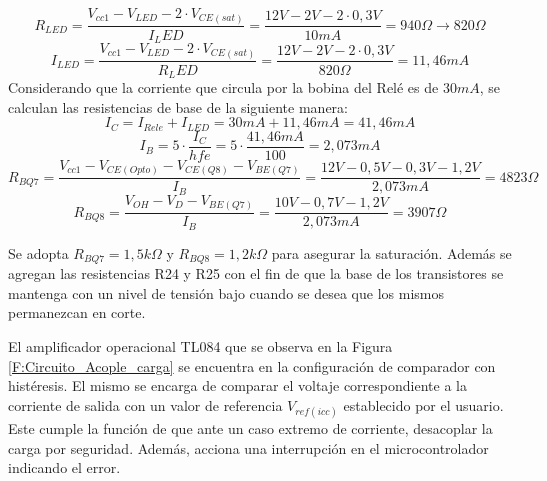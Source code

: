 \begin{equation}
R_{LED}=\frac{V_{cc1}-V_{LED}-2\cdot V_{CE(sat)}}{I_LED}=\frac{12V-2V-2\cdot 0,3V}{10 mA}=940\Omega \to 820 \Omega
\end{equation}
\begin{equation}
I_{LED}=\frac{V_{cc1}-V_{LED}-2\cdot V_{CE(sat)}}{R_LED}=\frac{12V-2V-2\cdot 0,3V}{820 \Omega}=11,46 mA
\end{equation}
Considerando que la corriente que circula por la bobina del Relé es de $30 mA$, se calculan las resistencias de base de la siguiente manera:
\begin{equation}
I_C=I_{Rele}+I_{LED}=30mA+11,46 mA=41,46 mA
\end{equation}
\begin{equation}
I_B=5\cdot \frac{I_C}{hfe}=5\cdot \frac{41,46 mA}{100}=2,073 mA
\end{equation}
\begin{equation}
	R_{BQ7}=\frac{V_{cc1}-V_{CE(Opto)}-V_{CE(Q8)}-V_{BE(Q7)}}{I_B}=\frac{12V-0,5V-0,3V-1,2V}{2,073mA}=4823 \Omega
\end{equation}
\begin{equation}
	R_{BQ8}=\frac{V_{OH}-V_D-V_{BE(Q7)}}{I_B}=\frac{10V-0,7V-1,2V}{2,073 mA}=3907 \Omega
\end{equation}

Se adopta $R_{BQ7}=1,5 k\Omega$ y $R_{BQ8}=1,2 k\Omega$ para asegurar la saturación. Además se agregan las resistencias R24 y R25 con el fin de que la base de los transistores se mantenga con un nivel de tensión bajo cuando se desea que los mismos permanezcan en corte.\par 
El amplificador operacional TL084 \cite{TL084} que se observa en la Figura \ref{F:Circuito_Acople_carga} se encuentra en la configuración de comparador con histéresis. El mismo se encarga de comparar el voltaje correspondiente a la corriente de salida con un valor de referencia $V_{ref(icc)}$ establecido por el usuario. Este cumple la función de que ante un caso extremo de corriente, desacoplar la carga por seguridad. Además, acciona una interrupción en el microcontrolador indicando el error.\par 


















